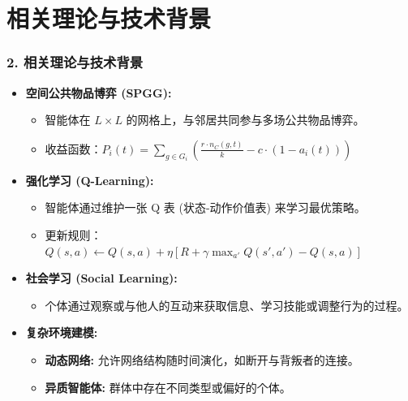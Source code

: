 \documentclass[UTF8]{beamer}
\begin{document}
\section{相关理论与技术背景}
\begin{frame}
    \frametitle{2. 相关理论与技术背景}
    \begin{itemize}
        \item \textbf{空间公共物品博弈 (SPGG):}
        \begin{itemize}
            \item 智能体在 $L \times L$ 的网格上，与邻居共同参与多场公共物品博弈。
            \item 收益函数：$P_i(t) = \sum_{g \in G_i} ( \frac{r \cdot n_C(g, t)}{k} - c \cdot (1 - a_i(t)) )$
        \end{itemize}
        \item \textbf{强化学习 (Q-Learning):}
        \begin{itemize}
            \item 智能体通过维护一张 Q 表 (状态-动作价值表) 来学习最优策略。
            \item 更新规则：$Q(s, a) \leftarrow Q(s, a) + \eta [ R + \gamma \max_{a'} Q(s', a') - Q(s, a) ]$
        \end{itemize}
        \item \textbf{社会学习 (Social Learning):}
        \begin{itemize}
            \item 个体通过观察或与他人的互动来获取信息、学习技能或调整行为的过程。
        \end{itemize}
        \item \textbf{复杂环境建模:}
        \begin{itemize}
            \item \textbf{动态网络:} 允许网络结构随时间演化，如断开与背叛者的连接。
            \item \textbf{异质智能体:} 群体中存在不同类型或偏好的个体。
        \end{itemize}
    \end{itemize}
\end{frame}

\end{document}
